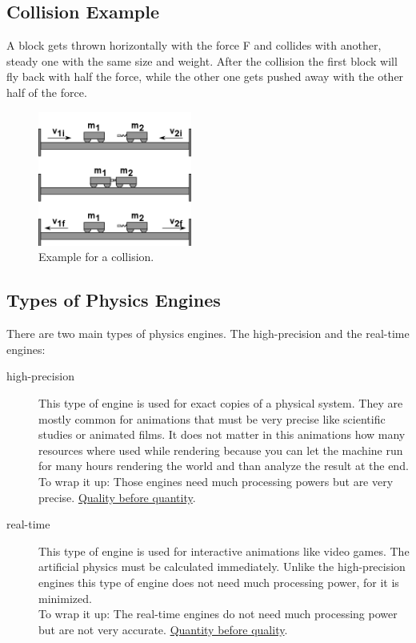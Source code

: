 \subsection{Collision Example}
A block gets thrown horizontally with the force F and collides with another, steady one with the same size and weight. After the collision the first block will fly back with half the force, while the other one gets pushed away with the other half of the force.

\begin{figure}[H]
  \includegraphics[width=0.45\textwidth]{images/collision_example.png}
  \caption[Collision example from \url{http://physicslearning2.colorado.edu/pira/resources/physics-testlecture-drawings}]{Example for a collision.}
\end{figure}

\subsection{Types of Physics Engines}
There are two main types of physics engines. The high-precision and the real-time engines:
\begin{description}
  \item[high-precision] This type of engine is used for exact copies of a physical system. They are mostly common for animations that must be very precise like scientific studies or animated films. It does not matter in this animations how many resources where used while rendering because you can let the machine run for many hours rendering the world and than analyze the result at the end.\smallskip\\
    To wrap it up: Those engines need much processing powers but are very precise. \ul{Quality before quantity}.
  \item[real-time] This type of engine is used for interactive animations like video games. The artificial physics must be calculated immediately. Unlike the high-precision engines this type of engine does not need much processing power, for it is minimized.\smallskip\\
    To wrap it up: The real-time engines do not need much processing power but are not very accurate. \ul{Quantity before quality}.
\end{description}

